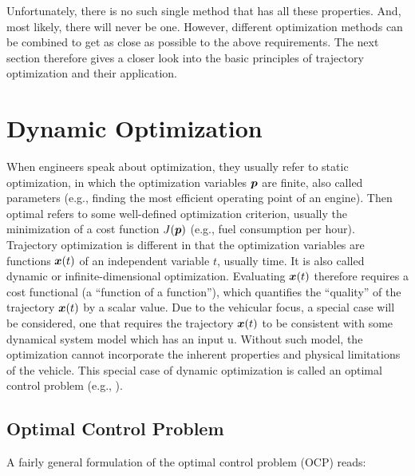 Unfortunately, there is no such single method that has all these properties. And, most likely, there will never be one. However, different optimization methods can be combined to get as close as possible to the above requirements. The next section therefore gives a closer look into the basic principles of trajectory optimization and their application.

\section{Dynamic Optimization}\label{S:57.2}

When engineers speak about optimization, they usually refer to static optimization, in which the optimization variables  $\boldsymbol{p}$  are finite, also called parameters (e.g., finding the most efficient operating point of an engine). Then optimal refers to some well-defined optimization criterion, usually the minimization of a cost function $J(\boldsymbol{p})$ (e.g., fuel consumption per hour). 
Trajectory optimization is different in that the optimization variables are functions $\boldsymbol{x}(t)$ of an independent variable $t$, usually time. It is also called dynamic or infinite-dimensional optimization. Evaluating $\boldsymbol{x}(t)$ therefore requires a cost functional (a “function of a function”), which quantifies the “quality” of the trajectory $\boldsymbol{x}(t)$ by a scalar value. 
Due to the vehicular focus, a special case will be considered, one that requires the trajectory $\boldsymbol{x}(t)$ to be consistent with some dynamical system model which has an input u. Without such model, the optimization cannot incorporate the inherent properties and physical limitations of the vehicle. This special case of dynamic optimization is called an optimal control problem (e.g., \cite{Lewis_OC}).

\subsection{Optimal Control Problem}\label{S:57.2.1}
A fairly general formulation of the optimal control problem (OCP) reads: \\

